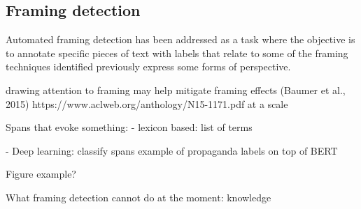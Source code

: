 
\subsection{Framing detection}
\label{ssec:lit_framing_auto}

Automated framing detection has been addressed as a task where the objective is to annotate specific pieces of text with labels that relate to some of the framing techniques identified previously express some forms of perspective.

drawing attention to framing may help mitigate framing effects (Baumer et al., 2015) https://www.aclweb.org/anthology/N15-1171.pdf
at a scale


Spans that evoke something:
- lexicon based: list of terms

- Deep learning: classify spans
example of propaganda labels on top of BERT

Figure example?

What framing detection cannot do at the moment: knowledge







